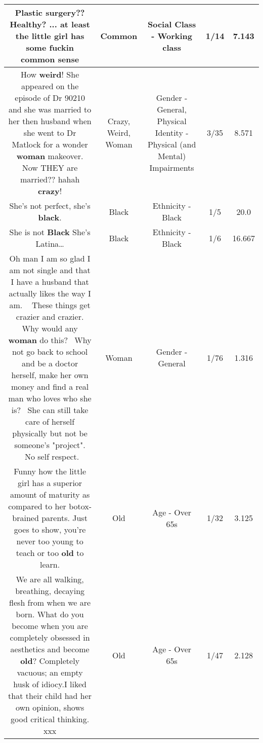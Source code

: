 \documentclass[11pt]{article}
\newlength\mylength
\begin{document}
\begin{center}
\begin{longtable}{|C{.65\mylength}|C{.30\mylength}|C{.12\mylength}|C{.12\mylength}|C{.12\mylength}|}
  \small Plastic surgery?? Healthy? ... at least the little girl has some fuckin \textbf{common} sense\normalsize   & Common & Social Class - Working class & 1/14 & 7.143 \\  \hline
  \small How \textbf{weird}! She appeared on the episode of Dr 90210 and she was married to her then husband when she went to Dr Matlock for a wonder \textbf{woman} makeover. Now THEY are married?? hahah \textbf{crazy}!\normalsize   & Crazy, Weird, Woman & Gender - General, Physical Identity - Physical (and Mental) Impairments & 3/35 & 8.571 \\  \hline
  \small She's not perfect, she's \textbf{black}.\normalsize   & Black & Ethnicity - Black & 1/5 & 20.0 \\  \hline
  \small She is not \textbf{Black} She's Latina…\normalsize   & Black & Ethnicity - Black & 1/6 & 16.667 \\  \hline
  \small Oh man I am so glad I am not single and that I have a husband that actually likes the way I am.   These things get crazier and crazier. Why would any \textbf{woman} do this?  Why not go back to school and be a doctor herself, make her own money and find a real man who loves who she is?  She can still take care of herself physically but not be someone's "project".  No self respect.\normalsize   & Woman & Gender - General & 1/76 & 1.316 \\  \hline
  \small Funny how the little girl has a superior amount of maturity as compared to her botox-brained parents. Just goes to show, you're never too young to teach or too \textbf{old} to learn.\normalsize   & Old & Age - Over 65s & 1/32 & 3.125 \\  \hline
  \small We are all walking, breathing, decaying flesh from when we are born. What do you become when you are completely obsessed in aesthetics and become \textbf{old}? Completely vacuous; an empty husk of idiocy.I liked that their child had her own opinion, shows good critical thinking. xxx\normalsize   & Old & Age - Over 65s & 1/47 & 2.128 \\  \hline

\end{longtable}
\end{center}
\end{document}
